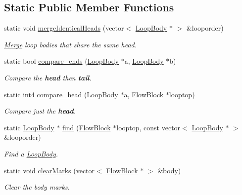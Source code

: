 \subsection*{Static Public Member Functions}
\begin{DoxyCompactItemize}
\item 
static void \mbox{\hyperlink{class_loop_body_a4f29c37ed94852f51302cbd3c0a9f85c}{merge\+Identical\+Heads}} (vector$<$ \mbox{\hyperlink{class_loop_body}{Loop\+Body}} $\ast$ $>$ \&looporder)
\begin{DoxyCompactList}\small\item\em \mbox{\hyperlink{class_merge}{Merge}} loop bodies that share the same {\itshape head}. \end{DoxyCompactList}\item 
static bool \mbox{\hyperlink{class_loop_body_af92c183b5af2d39509af1148ffeb8acf}{compare\+\_\+ends}} (\mbox{\hyperlink{class_loop_body}{Loop\+Body}} $\ast$a, \mbox{\hyperlink{class_loop_body}{Loop\+Body}} $\ast$b)
\begin{DoxyCompactList}\small\item\em Compare the {\bfseries{head}} then {\bfseries{tail}}. \end{DoxyCompactList}\item 
static int4 \mbox{\hyperlink{class_loop_body_aa21c0bf7e110479ebeb1590c8ef58542}{compare\+\_\+head}} (\mbox{\hyperlink{class_loop_body}{Loop\+Body}} $\ast$a, \mbox{\hyperlink{class_flow_block}{Flow\+Block}} $\ast$looptop)
\begin{DoxyCompactList}\small\item\em Compare just the {\bfseries{head}}. \end{DoxyCompactList}\item 
static \mbox{\hyperlink{class_loop_body}{Loop\+Body}} $\ast$ \mbox{\hyperlink{class_loop_body_a4fd224d75508dcfb4826877b99ad32ce}{find}} (\mbox{\hyperlink{class_flow_block}{Flow\+Block}} $\ast$looptop, const vector$<$ \mbox{\hyperlink{class_loop_body}{Loop\+Body}} $\ast$ $>$ \&looporder)
\begin{DoxyCompactList}\small\item\em Find a \mbox{\hyperlink{class_loop_body}{Loop\+Body}}. \end{DoxyCompactList}\item 
static void \mbox{\hyperlink{class_loop_body_ad6ed614162d7e081baeb297718c0e58c}{clear\+Marks}} (vector$<$ \mbox{\hyperlink{class_flow_block}{Flow\+Block}} $\ast$ $>$ \&body)
\begin{DoxyCompactList}\small\item\em Clear the body marks. \end{DoxyCompactList}\end{DoxyCompactItemize}


